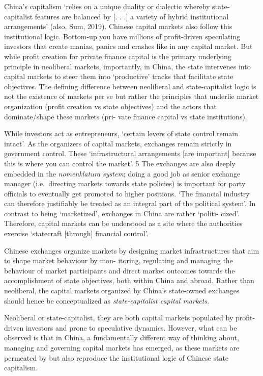 \documentclass[
]{book}
\begin{document}
China's capitalism `relies on a unique duality or dialectic whereby state-
capitalist features are balanced by {[}. . .{]} a variety of hybrid institutional arrangements'
(also, Sum, 2019). Chinese capital markets also follow this institutional logic. Bottom-up
you have millions of profit-driven speculating investors that create manias, panics and
crashes like in any capital market. But while profit creation for private finance capital is
the primary underlying principle in neoliberal markets, importantly, in China, the state
intervenes into capital markets to steer them into `productive' tracks that facilitate state
objectives. The defining difference between neoliberal and state-capitalist logic is not the
existence of markets per se but rather the principles that underlie market organization
(profit creation vs state objectives) and the actors that dominate/shape these markets (pri-
vate finance capital vs state institutions).

While investors act as entrepreneurs, `certain levers of state control remain intact'.
As the organizers of capital markets, exchanges remain strictly in
government control.
These `infrastructural
arrangements {[}are important{]} because this is where you can control the market'. 5 The
exchanges are also deeply embedded in the \emph{nomenklatura system}; doing a
good job as senior exchange manager (i.e.~directing markets towards state policies)
is important for party officials to eventually get promoted to higher positions.
`The financial industry can therefore justifiably be treated as an integral part of the
political system'. In contrast to being `marketized', exchanges in China are rather `politi-
cized'. Therefore, capital markets can be understood as a site where the authorities exercise
`statecraft {[}through{]} financial control'.

Chinese exchanges organize
markets by designing market infrastructures that aim to shape market behaviour by mon-
itoring, regulating and managing the behaviour of market participants and direct market
outcomes towards the accomplishment of state objectives, both within China and abroad.
Rather than neoliberal, the capital markets organized by China's state-owned exchanges
should hence be conceptualized as \emph{state-capitalist capital markets}.

Neoliberal or state-capitalist,
they are both capital markets populated by profit-driven investors and prone to speculative
dynamics. However, what can be observed is that in China, a fundamentally different way of
thinking about, managing and governing capital markets has emerged, as these markets are
permeated by but also reproduce the institutional logic of Chinese state capitalism.
\end{document}
